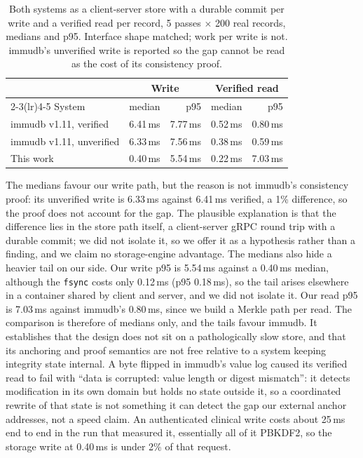 \documentclass[conference]{IEEEtran}
\begin{document}
\begin{table}[t]
\caption{Both systems as a client-server store with a durable commit per write and a verified
read per record, 5 passes $\times$ 200 real records, medians and p95. Interface shape matched; work per write is not.
immudb's unverified write is reported so the gap cannot be read as the cost of its consistency
proof.}
\label{tab:baseline}
\centering
\scriptsize
\begin{tabular}{lrrrr}
\toprule
 & \multicolumn{2}{c}{Write} & \multicolumn{2}{c}{Verified read} \\
\cmidrule(lr){2-3}\cmidrule(lr){4-5}
System & median & p95 & median & p95 \\
\midrule
immudb v1.11, verified & 6.41\,ms & 7.77\,ms & 0.52\,ms & 0.80\,ms \\
immudb v1.11, unverified & 6.33\,ms & 7.56\,ms & 0.38\,ms & 0.59\,ms \\
This work & 0.40\,ms & 5.54\,ms & 0.22\,ms & 7.03\,ms \\
\bottomrule
\end{tabular}
\end{table}

The medians favour our write path, but the reason is not immudb's consistency proof: its unverified write is
6.33\,ms against 6.41\,ms verified, a 1\% difference, so the proof does not account for the gap. The plausible
explanation is that the difference lies in the store path itself, a client-server gRPC round trip with a durable
commit; we did not isolate it, so we offer it as a hypothesis rather than a finding, and we claim no
storage-engine advantage. The medians also hide a heavier tail on our side. Our write p95 is 5.54\,ms against a
0.40\,ms median, although the \texttt{fsync} costs only 0.12\,ms (p95 0.18\,ms), so the tail arises elsewhere in
a container shared by client and server, and we did not isolate it. Our read p95 is 7.03\,ms against immudb's
0.80\,ms, since we build a Merkle path per read. The comparison is therefore of medians only, and the tails
favour immudb. It establishes that the design does not sit on a pathologically slow store, and that its
anchoring and proof semantics are not free relative to a system keeping integrity state internal. A byte flipped
in immudb's value log caused its verified read to fail with ``data is corrupted: value length or digest
mismatch'': it detects modification in its own domain but holds no state outside it, so a coordinated rewrite of
that state is not something it can detect the gap our external anchor addresses, not a speed claim. An
authenticated clinical write costs about 25\,ms end to end in the run that measured it, essentially all of it
PBKDF2, so the storage write at 0.40\,ms is under 2\% of that request.
\end{document}
